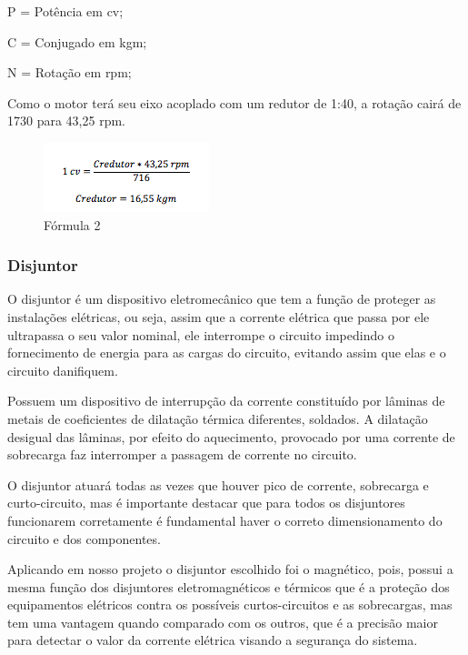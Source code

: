P = Potência em cv;

C = Conjugado em kgm;

N = Rotação em rpm;

Como o motor terá seu eixo acoplado com um redutor de 1:40, a rotação cairá de 1730 para 43,25 rpm.

\begin{figure}[!h]
	\centering
		\includegraphics[scale=0.9]{figuras/energia/4.png}
	\caption{Fórmula 2}
\end{figure}

\subsubsection{Disjuntor}

O disjuntor é um dispositivo eletromecânico que tem a função de proteger as instalações elétricas, ou seja, assim que a corrente elétrica que passa por ele ultrapassa o seu valor nominal, ele interrompe o circuito impedindo o fornecimento de energia para as cargas do circuito, evitando assim que elas e o circuito danifiquem.

Possuem um dispositivo de interrupção da corrente constituído por lâminas de metais de coeficientes de dilatação térmica diferentes, soldados. A dilatação desigual das lâminas, por efeito do aquecimento, provocado por uma corrente de sobrecarga faz interromper a passagem de corrente no circuito.

O disjuntor atuará todas as vezes que houver pico de corrente, sobrecarga e curto-circuito, mas é importante destacar que para todos os disjuntores funcionarem corretamente é fundamental haver o correto dimensionamento do circuito e dos componentes.

Aplicando em nosso projeto o disjuntor escolhido foi o magnético, pois, possui a mesma função dos disjuntores eletromagnéticos e térmicos que é a proteção dos equipamentos elétricos contra os possíveis curtos-circuitos e as sobrecargas, mas tem uma vantagem quando comparado com os outros, que é a precisão maior para detectar o valor da corrente elétrica visando a segurança do sistema.

